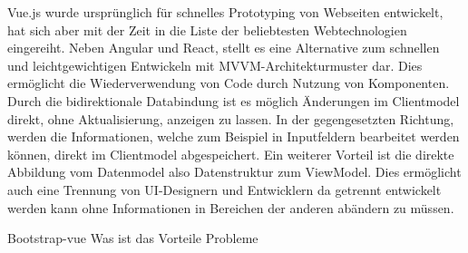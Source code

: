     Vue.js \cite{you2018vue} wurde ursprünglich für schnelles Prototyping von Webseiten entwickelt, hat sich aber mit der Zeit in die Liste der beliebtesten Webtechnologien eingereiht. Neben Angular und React, stellt es eine Alternative zum schnellen und leichtgewichtigen Entwickeln mit \ac{MVVM}-Architekturmuster dar. Dies ermöglicht die Wiederverwendung von Code durch Nutzung von Komponenten. Durch die bidirektionale Databindung ist es möglich Änderungen im Clientmodel direkt, ohne Aktualisierung, anzeigen zu lassen. In der gegengesetzten Richtung, werden die Informationen, welche zum Beispiel in Inputfeldern bearbeitet werden können, direkt im Clientmodel abgespeichert. Ein weiterer Vorteil ist die direkte Abbildung vom Datenmodel also Datenstruktur zum ViewModel. Dies ermöglicht auch eine Trennung von UI-Designern und Entwicklern da getrennt entwickelt werden kann ohne Informationen in Bereichen der anderen abändern zu müssen.
    
    Bootstrap-vue
        Was ist das
        Vorteile
        Probleme